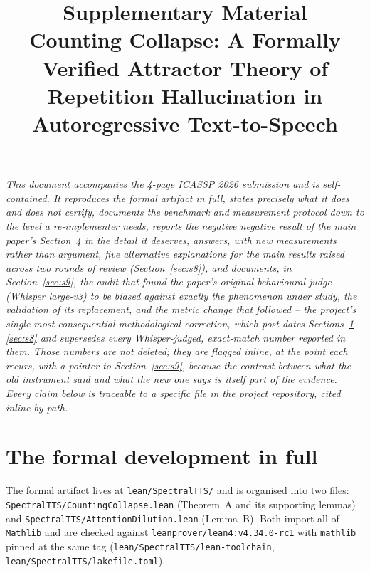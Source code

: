 \documentclass[11pt]{article}
\title{Supplementary Material\\[2pt]
\large Counting Collapse: A Formally Verified Attractor Theory of\\
Repetition Hallucination in Autoregressive Text-to-Speech}
\author{}
\date{}
\begin{document}
\maketitle

\vspace{-2.5em}
\begin{center}
\emph{This document accompanies the 4-page ICASSP 2026 submission and is
self-contained. It reproduces the formal artifact in full, states precisely
what it does and does not certify, documents the benchmark and measurement
protocol down to the level a re-implementer needs, reports the negative
negative result of the main paper's Section~4 in the detail it deserves, answers,
with new measurements rather than argument, five alternative explanations
for the main results raised across two rounds of review
(Section~\ref{sec:s8}), and documents, in Section~\ref{sec:s9}, the audit
that found the paper's original behavioural judge (Whisper large-v3) to be
biased against exactly the phenomenon under study, the validation of its
replacement, and the metric change that followed -- the project's single
most consequential methodological correction, which post-dates
Sections~\ref{sec:s1}--\ref{sec:s8} and supersedes every Whisper-judged,
exact-match number reported in them. Those numbers are not deleted; they are
flagged inline, at the point each recurs, with a pointer to
Section~\ref{sec:s9}, because the contrast between what the old instrument
said and what the new one says is itself part of the evidence. Every claim
below is traceable to a specific file in the project repository, cited
inline by path.}
\end{center}

\tableofcontents

\section{The formal development in full}
\label{sec:s1}

The formal artifact lives at \texttt{lean/SpectralTTS/} and is organised into
two files: \texttt{SpectralTTS/CountingCollapse.lean} (Theorem~A and its
supporting lemmas) and \texttt{SpectralTTS/AttentionDilution.lean} (Lemma~B).
Both import all of \texttt{Mathlib} and are checked against
\texttt{leanprover/lean4:v4.34.0-rc1} with \texttt{mathlib} pinned at the same
tag (\texttt{lean/SpectralTTS/lean-toolchain},
\texttt{lean/SpectralTTS/lakefile.toml}).
\end{document}
